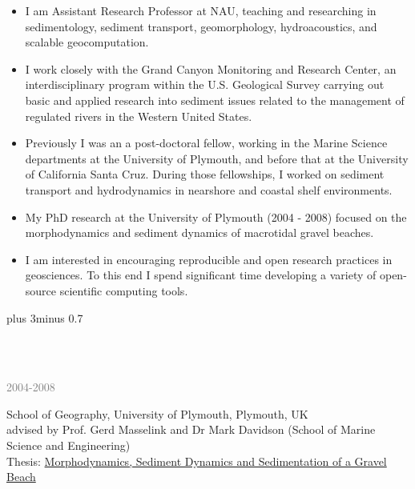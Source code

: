 \documentclass{article} %
\def\bf{\bfseries}
\def\sf{\sffamily}
\def\sl{\slshape}
\newlength\sidebarwidth
\newcommand{\topic}[3][]%
	 {\pagebreak[2]%
	 \vskip 1.5\baselineskip plus 3\baselineskip minus 0.7\baselineskip
	 \begin{minipage}{\textwidth}
         \phantomsection\addcontentsline{toc}{section}{#1}%
         \nopagebreak\hspace{0in}%
         \nopagebreak\begin{minipage}[t]{\sidebarwidth - .2cm}
         \raggedleft \bf\sf
	 \color{deep_blue}{\Large #2}
	 \end{minipage}%
	 \hfill
	 \begin{minipage}[t]{\linewidth - \sidebarwidth}
	 \nopagebreak{\color{deep_blue}%
		    \rule{0pt}{\baselineskip}%
		    \rule{\linewidth}{2.5pt}%
		    \llap{\raisebox{.3\baselineskip}{\sf #1}}%
		    \vspace*{.1\baselineskip}%
		    }%
	 #3%
	 \end{minipage}
	 \end{minipage}}
\newcommand{\subtopic}[3][]
	 {\begin{minipage}{\textwidth}
	 \vspace*{.4\baselineskip}
         \nopagebreak\hspace{0in}%
         \nopagebreak\begin{minipage}[t]{\sidebarwidth - .2cm}
         \raggedleft {\sf\fontseries{sbc}\selectfont #2}
         {\\[-0.2\baselineskip] \textcolor{gray}{\footnotesize #1}}
	 \end{minipage}%
	 \hfill
	 \begin{minipage}[t]{\linewidth - \sidebarwidth}
	 #3%
	 \end{minipage}%
	 \vspace*{.2\baselineskip plus 1\baselineskip minus
	 .2\baselineskip}%
	 \end{minipage}}
\def\mydot{\textcolor{deep_blue}{\rule{1ex}{1ex}}}
\begin{document}
\begin{multicols}{2}
\sloppy


\begin{itemize}[leftmargin=2ex, itemsep=0ex]
\item[\mydot]
I am Assistant Research Professor at NAU, teaching and researching in sedimentology, sediment transport, geomorphology, hydroacoustics, and
scalable geocomputation. 

\item[\mydot]
I work closely with the Grand Canyon Monitoring and Research Center, an
interdisciplinary program within the U.S. Geological Survey carrying out basic and applied research into sediment issues related to the management of regulated rivers in the Western United States.

\item[\mydot]
Previously I was an a post-doctoral fellow,
working in the Marine Science departments
at the University of Plymouth, and before that at the University of California Santa Cruz. During those fellowships, I worked on
sediment transport and hydrodynamics in nearshore and coastal shelf environments.

\item[\mydot]
My PhD research at the University of Plymouth (2004 - 2008) focused on the morphodynamics and sediment dynamics of macrotidal gravel beaches.

\item[\mydot]
I am interested in encouraging reproducible and open research practices
in geosciences.  To this end I spend significant time developing a variety of open-source
scientific computing tools.

\end{itemize}
\end{multicols}
\vspace*{-1.5em}
\fussy

\topic{E \large\hskip -1ex DUCATION}{~}

    \subtopic[2004-2008]{\bf PhD}{
        School of Geography, University of Plymouth, Plymouth, UK\\
        advised by Prof. Gerd Masselink and Dr Mark Davidson (School of Marine Science and Engineering)\\
	Thesis: \href{https://dbuscombe-usgs.github.io/media/pdfs/Buscombe_thesis_june2008.pdf}{
          Morphodynamics, Sediment Dynamics and Sedimentation of a Gravel Beach}
    }
\end{document}
